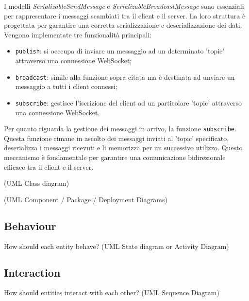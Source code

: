 I modelli \textit{SerializableSendMessage} e \textit{SerializableBroadcastMessage} sono essenziali per rappresentare i messaggi scambiati tra il client e
il server. La loro struttura è progettata per garantire una corretta serializzazione e deserializzazione dei dati. \\

Vengono implementate tre funzionalità principali:
\begin{itemize}
    \item \texttt{publish}: si occcupa di inviare un messaggio ad un determinato 'topic' attraverso una connessione WebSocket;
    \item \texttt{broadcast}: simile alla funzione sopra citata ma è destinata ad unviare un messaggio a tutti i client connessi;
    \item \texttt{subscribe}: gestisce l'iscrizione del client ad un particolare 'topic' attraverso una connessione WebSocket.
\end{itemize}

Per quanto riguarda la gestione dei messaggi in arrivo, la funzione \texttt{subscribe}.
Questa funzione rimane in ascolto dei messaggi inviati al 'topic' specificato, deserializza i messaggi ricevuti e li memorizza per un successivo utilizzo.
Questo meccanismo è fondamentale per garantire una comunicazione bidirezionale efficace tra il client e il server.

%
(UML Class diagram)

%
(UML Component / Package / Deployment Diagrams)

\subsection{Behaviour}

How should each entity behave?
%
(UML State diagram or Activity Diagram)

\subsection{Interaction}

How should entities interact with each other?
%
(UML Sequence Diagram)

